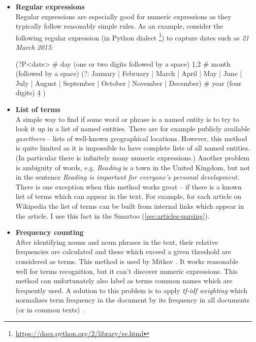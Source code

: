 \documentclass[12pt, twoside]{fithesis2}
\renewcommand{\_}{\leavevmode \kern0.07em\vbox{\hrule width0.4em}}
\newcommand{\squarebullet}{\textcolor{black}{\raisebox{0.15em}{\rule{4pt}{4pt}}}}
\newcommand{\emptysquarebullet}{\textcolor{black}{\raisebox{0.10em}{\tiny$\square$}}}
\newenvironment{myItemize}{
  \begin{itemize}[leftmargin=2em,rightmargin=1em,itemsep=\parskip ,parsep=0em,topsep=0em,partopsep=0em]
  \renewcommand{\labelitemi}{\squarebullet}
  \renewcommand{\labelitemii}{\textbullet}
}{
  \end{itemize}
}
\begin{document}
\begin{myItemize}
\item \textbf{Regular expressions}\\
  Regular expressions are especially good for numeric expressions as they typically follow reasonably simple rules.
  As an example, consider the following regular expression (in Python dialect%
  \footnote{\url{https://docs.python.org/2/library/re.html}})
  to capture dates such as \emph{21 March 2015}:
\begin{code}
(?P<date>
    # day (one or two digits followed by a space)
    \d{1,2} \s
    # month (followed by a space)
    (?: January | February | March | April | May | June | July |
         August | September | October | November | December) \s
    # year (four digits)
    \d{4}
)
\end{code}


\item \textbf{List of terms}\\
  A simple way to find if some word or phrase is a named entity is to try to look it up in a list of named entities. There are for example publicly available \textit{gazetteers} -- lists of well-known geographical locations. However, this method is quite limited as it is impossible to have complete lists of all named entities.
(In particular there is infinitely many numeric expressions.)
Another problem is ambiguity of words, e.g. \textit{Reading} is a town in the United Kingdom, but not in the sentence \textit{Reading is important for everyone's personal development.}
  There is one exception when this method works great -- if there is a known list of terms which can appear in the text. For example, for each article on Wikipedia the list of terms can be built from internal links which appear in the article. I use this fact in the Smartoo (\autoref{sec:articles-parsing}).

\item \textbf{Frequency counting}\\
  After identifying nouns and noun phrases in the text, their relative frequencies are calculated and these which exceed a given threshold are considered as terms.
  This method is used by Mitkov \cite{question-gen-mitkov}. It works reasonable well for terms recognition, but it can't discover numeric expressions.
This method can unfortunately also label as terms common names which are frequently used.
A solution to this problem is to apply \textit{tf-idf weighting} which normalizes term frequency in the document by its frequency in all documents (or in common texts) \cite[][118]{information-retrieval}.


\end{myItemize}
\end{document}
